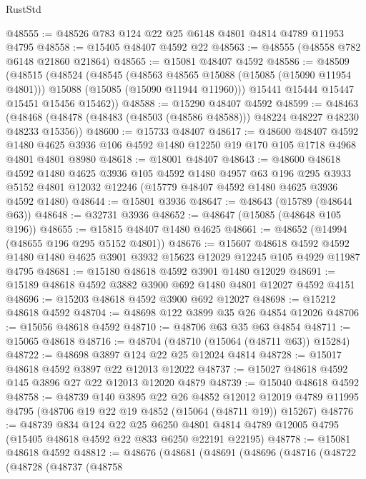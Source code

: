 \begin{lexlean}{RustStd}
\begin{coremodule}
@48555 := @48526 @783 @124 @22 @25 @6148 @4801 @4814 @4789 @11953 @4795
@48558 := @15405 @48407 @4592 @22
@48563 := @48555 (@48558 @782 @6148 @21860 @21864)
@48565 := @15081 @48407 @4592
@48586 := @48509
    (@48515
      (@48524
        (@48545
          (@48563 @48565 @15088 (@15085 (@15090 @11954 @4801)))
          @15088
          (@15085 (@15090 @11944 @11960)))
        @15441
        @15444
        @15447
        @15451
        @15456
        @15462))
@48588 := @15290 @48407 @4592
@48599 := @48463
    (@48468 (@48478 (@48483 (@48503 (@48586 @48588))) @48224 @48227 @48230 @48233 @15356))
@48600 := @15733 @48407
@48617 := @48600
    @48407
    @4592
    @1480
    @4625
    @3936
    @106
    @4592
    @1480
    @12250
    @19
    @170
    @105
    @1718
    @4968
    @4801
    @4801
    @8980
@48618 := @18001 @48407
@48643 := @48600
    @48618
    @4592
    @1480
    @4625
    @3936
    @105
    @4592
    @1480
    @4957
    @63
    @196
    @295
    @3933
    @5152
    @4801
    @12032
    @12246
    (@15779 @48407 @4592 @1480 @4625 @3936 @4592 @1480)
@48644 := @15801 @3936
@48647 := @48643 (@15789 (@48644 @63))
@48648 := @32731 @3936
@48652 := @48647 (@15085 (@48648 @105 @196))
@48655 := @15815 @48407 @1480 @4625
@48661 := @48652 (@14994 (@48655 @196 @295 @5152 @4801))
@48676 := @15607
    @48618
    @4592
    @4592
    @1480
    @1480
    @4625
    @3901
    @3932
    @15623
    @12029
    @12245
    @105
    @4929
    @11987
    @4795
@48681 := @15180 @48618 @4592 @3901 @1480 @12029
@48691 := @15189 @48618 @4592 @3882 @3900 @692 @1480 @4801 @12027 @4592 @4151
@48696 := @15203 @48618 @4592 @3900 @692 @12027
@48698 := @15212 @48618 @4592
@48704 := @48698 @122 @3899 @35 @26 @4854 @12026
@48706 := @15056 @48618 @4592
@48710 := @48706 @63 @35 @63 @4854
@48711 := @15065 @48618
@48716 := @48704 (@48710 (@15064 (@48711 @63)) @15284)
@48722 := @48698 @3897 @124 @22 @25 @12024 @4814
@48728 := @15017 @48618 @4592 @3897 @22 @12013 @12022
@48737 := @15027 @48618 @4592 @145 @3896 @27 @22 @12013 @12020 @4879
@48739 := @15040 @48618 @4592
@48758 := @48739
    @140
    @3895
    @22
    @26
    @4852
    @12012
    @12019
    @4789
    @11995
    @4795
    (@48706 @19 @22 @19 @4852 (@15064 (@48711 @19)) @15267)
@48776 := @48739
    @834
    @124
    @22
    @25
    @6250
    @4801
    @4814
    @4789
    @12005
    @4795
    (@15405 @48618 @4592 @22 @833 @6250 @22191 @22195)
@48778 := @15081 @48618 @4592
@48812 := @48676
    (@48681
      (@48691
        (@48696
          (@48716
            (@48722
              (@48728
                (@48737
                  (@48758

\end{coremodule}
\end{lexlean}
